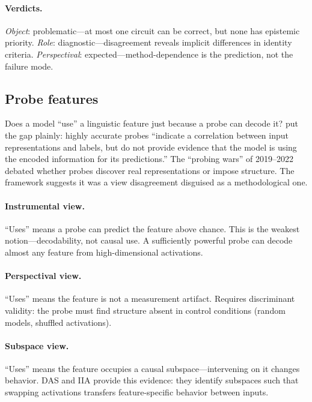 \documentclass{article}
\begin{document}
\paragraph{Verdicts.}
\emph{Object}: problematic---at most one circuit can be correct, but
none has epistemic priority.
\emph{Role}: diagnostic---disagreement reveals implicit differences in
identity criteria.
\emph{Perspectival}: expected---method-dependence is the prediction, not
the failure mode.


\subsection{Probe features}\label{app:cs_probe}

Does a model ``use'' a linguistic feature just because a probe can decode
it?  \citet{ferrando2024} put the gap plainly: highly accurate probes
``indicate a correlation between input representations and labels, but do not
provide evidence that the model is using the encoded information for its
predictions.'' The ``probing wars'' of 2019--2022~\citep{hewitt2019, belinkov2022}
debated whether probes discover real representations or impose structure.
The framework suggests it was a view disagreement disguised as a
methodological one.

\paragraph{Instrumental view.}
``Uses'' means a probe can predict the feature above chance. This is the
weakest notion---decodability, not causal use. A sufficiently powerful
probe can decode almost any feature from high-dimensional activations.

\paragraph{Perspectival view.}
``Uses'' means the feature is not a measurement artifact. Requires
discriminant validity: the probe must find structure absent in control
conditions (random models, shuffled activations).

\paragraph{Subspace view.}
``Uses'' means the feature occupies a causal subspace---intervening on
it changes behavior. DAS and IIA provide this evidence: they identify
subspaces such that swapping activations transfers feature-specific
behavior between inputs.
\end{document}
